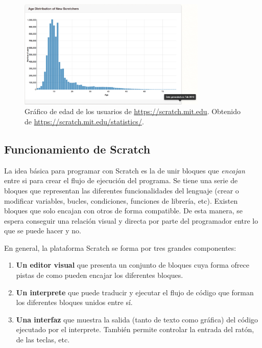 \begin{figure}[!ht]
	\begin{centering}
		\includegraphics[width=0.8\textwidth]{images/scratch-edad.png}
			\caption{Gráfico de edad de los usuarios de \url{https://scratch.mit.edu}. Obtenido de \url{https://scratch.mit.edu/statistics/}.}
				\label{fig:scratch-edad}
	\end{centering}
\end{figure}


\subsection{Funcionamiento de Scratch}
\label{sec:scratch-funcionamiento}

La idea básica para programar con Scratch es la de unir bloques que \emph{encajan} entre si para crear el flujo de ejecución del programa. Se tiene una serie de bloques que representan las diferentes funcionalidades del lenguaje (crear o modificar variables, bucles, condiciones, funciones de librería, etc). Existen bloques que solo encajan con otros de forma compatible. De esta manera, se espera conseguir una relación visual y directa por parte del programador entre lo que se puede hacer y no. 


En general, la plataforma Scratch se forma por tres grandes componentes:
\begin{enumerate}
	\item \textbf{Un editor visual} que presenta un conjunto de bloques cuya forma ofrece pistas de como pueden encajar los diferentes bloques.
	\item \textbf{Un interprete} que puede traducir y ejecutar el flujo de código que forman los diferentes bloques unidos entre sí.
	\item \textbf{Una interfaz} que muestra la salida (tanto de texto como gráfica) del código ejecutado por el interprete. También permite controlar la entrada del ratón, de las teclas, etc.
\end{enumerate}

